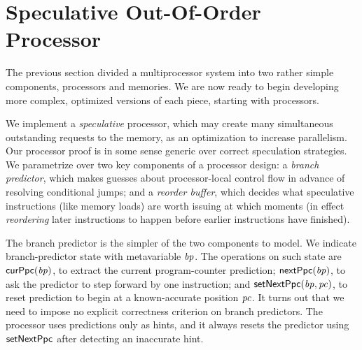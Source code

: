 \section{Speculative Out-Of-Order Processor}\label{sec:ooo}

The previous section divided a multiprocessor system into two rather
simple components, processors and memories.  We are now ready to begin
developing more complex, optimized versions of each piece, starting
with processors.

We implement a \emph{speculative} processor, which may create many
simultaneous outstanding requests to the memory, as an optimization to
increase parallelism.  Our processor proof is in some sense generic
over correct speculation strategies.  We parametrize over two key
components of a processor design: a \emph{branch predictor}, which
makes guesses about processor-local control flow in advance of
resolving conditional jumps; and a
\emph{reorder buffer}, which decides what speculative instructions (like memory loads)
are worth issuing at which moments (in effect \emph{reordering} later
instructions to happen before earlier instructions have finished).

The branch predictor is the simpler of the two components to model.
We indicate branch-predictor state with metavariable $\mathit{bp}$.
The operations on such state are $\mathsf{curPpc}(\mathit{bp})$, to extract the
current program-counter prediction; $\mathsf{nextPpc}(\mathit{bp})$, to ask the
predictor to step forward by one instruction; and $\mathsf{setNextPpc}(\mathit{bp}, \mathit{pc})$,
to reset prediction to begin at a known-accurate position $\mathit{pc}$.  It
turns out that we need to impose no explicit correctness criterion on
branch predictors.  The processor uses predictions only as hints, and
it always resets the predictor using $\mathsf{setNextPpc}$ after detecting an
inaccurate hint.

